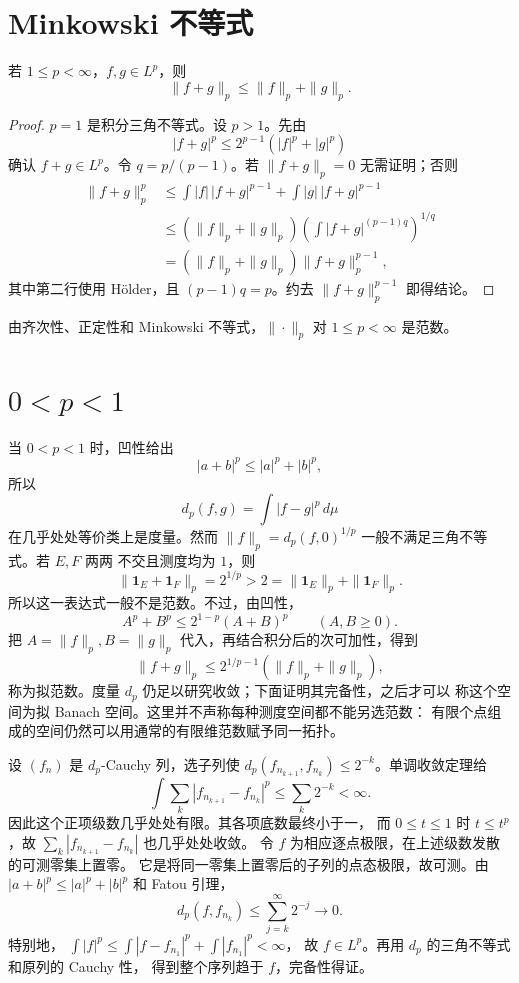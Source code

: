 \section{Minkowski 不等式}

\begin{theorem}[Minkowski]
\label{thm:minkowski}
若 \(1\le p<\infty\)，\(f,g\in L^p\)，则
\[
 \|f+g\|_p\le\|f\|_p+\|g\|_p.
\]
\end{theorem}

\begin{proof}
\(p=1\) 是积分三角不等式。设 \(p>1\)。先由
\[
 |f+g|^p\le2^{p-1}(|f|^p+|g|^p)
\]
确认 \(f+g\in L^p\)。令 \(q=p/(p-1)\)。若
\(\|f+g\|_p=0\) 无需证明；否则
\[
\begin{aligned}
 \|f+g\|_p^p
 &\le\int |f|\,|f+g|^{p-1}
      +\int |g|\,|f+g|^{p-1}\\
 &\le(\|f\|_p+\|g\|_p)
 \left(\int|f+g|^{(p-1)q}\right)^{1/q}\\
 &=(\|f\|_p+\|g\|_p)\|f+g\|_p^{p-1},
\end{aligned}
\]
其中第二行使用 Hölder，且 \((p-1)q=p\)。约去
\(\|f+g\|_p^{p-1}\) 即得结论。
\end{proof}

由齐次性、正定性和 Minkowski 不等式，\(\|\cdot\|_p\) 对
\(1\le p<\infty\) 是范数。

\section{\texorpdfstring{\(0<p<1\)}{0<p<1}}

当 \(0<p<1\) 时，凹性给出
\[
 |a+b|^p\le|a|^p+|b|^p,
\]
所以
\[
 d_p(f,g)=\int|f-g|^p\,d\mu
\]
在几乎处处等价类上是度量。然而
\(\|f\|_p=d_p(f,0)^{1/p}\) 一般不满足三角不等式。若 \(E,F\) 两两
不交且测度均为 \(1\)，则
\[
 \|\mathbf1_E+\mathbf1_F\|_p=2^{1/p}>2
 =\|\mathbf1_E\|_p+\|\mathbf1_F\|_p.
\]
所以这一表达式一般不是范数。不过，由凹性，
\[
 A^p+B^p\le2^{1-p}(A+B)^p\qquad(A,B\ge0).
\]
把 \(A=\|f\|_p,B=\|g\|_p\) 代入，再结合积分后的次可加性，得到
\[
 \|f+g\|_p\le2^{1/p-1}(\|f\|_p+\|g\|_p),
\]
称为拟范数。度量 \(d_p\) 仍足以研究收敛；下面证明其完备性，之后才可以
称这个空间为拟 Banach 空间。这里并不声称每种测度空间都不能另选范数：
有限个点组成的空间仍然可以用通常的有限维范数赋予同一拓扑。

设 \((f_n)\) 是 \(d_p\)-Cauchy 列，选子列使
\(d_p(f_{n_{k+1}},f_{n_k})\le2^{-k}\)。单调收敛定理给
\[
 \int\sum_k|f_{n_{k+1}}-f_{n_k}|^p\le\sum_k2^{-k}<\infty.
\]
因此这个正项级数几乎处处有限。其各项底数最终小于一，
而 \(0\le t\le1\) 时 \(t\le t^p\)，故
\(\sum_k|f_{n_{k+1}}-f_{n_k}|\) 也几乎处处收敛。
令 \(f\) 为相应逐点极限，在上述级数发散的可测零集上置零。
它是将同一零集上置零后的子列的点态极限，故可测。由
\(|a+b|^p\le|a|^p+|b|^p\) 和 Fatou 引理，
\[
 d_p(f,f_{n_k})\le\sum_{j=k}^\infty2^{-j}\longrightarrow0.
\]
特别地，
\(\int|f|^p\le\int|f-f_{n_1}|^p+\int|f_{n_1}|^p<\infty\)，
故 \(f\in L^p\)。再用 \(d_p\) 的三角不等式和原列的 Cauchy 性，
得到整个序列趋于 \(f\)，完备性得证。

